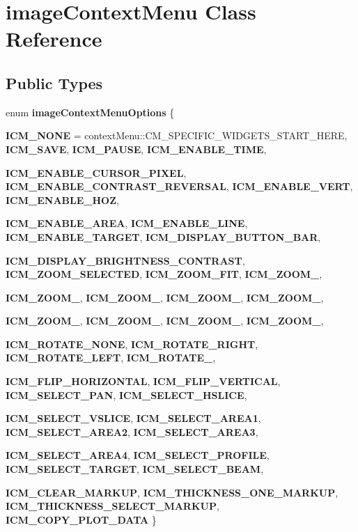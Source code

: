 \hypertarget{classimageContextMenu}{
\section{imageContextMenu Class Reference}
\label{classimageContextMenu}
}
\subsection*{Public Types}
\begin{DoxyCompactItemize}
\item 
enum {\bfseries imageContextMenuOptions} \{ \par
{\bfseries ICM\_\-NONE} =  contextMenu::CM\_\-SPECIFIC\_\-WIDGETS\_\-START\_\-HERE, 
{\bfseries ICM\_\-SAVE}, 
{\bfseries ICM\_\-PAUSE}, 
{\bfseries ICM\_\-ENABLE\_\-TIME}, 
\par
{\bfseries ICM\_\-ENABLE\_\-CURSOR\_\-PIXEL}, 
{\bfseries ICM\_\-ENABLE\_\-CONTRAST\_\-REVERSAL}, 
{\bfseries ICM\_\-ENABLE\_\-VERT}, 
{\bfseries ICM\_\-ENABLE\_\-HOZ}, 
\par
{\bfseries ICM\_\-ENABLE\_\-AREA}, 
{\bfseries ICM\_\-ENABLE\_\-LINE}, 
{\bfseries ICM\_\-ENABLE\_\-TARGET}, 
{\bfseries ICM\_\-DISPLAY\_\-BUTTON\_\-BAR}, 
\par
{\bfseries ICM\_\-DISPLAY\_\-BRIGHTNESS\_\-CONTRAST}, 
{\bfseries ICM\_\-ZOOM\_\-SELECTED}, 
{\bfseries ICM\_\-ZOOM\_\-FIT}, 
{\bfseries ICM\_\-ZOOM\_}, 
\par
{\bfseries ICM\_\-ZOOM\_}, 
{\bfseries ICM\_\-ZOOM\_}, 
{\bfseries ICM\_\-ZOOM\_}, 
{\bfseries ICM\_\-ZOOM\_}, 
\par
{\bfseries ICM\_\-ZOOM\_}, 
{\bfseries ICM\_\-ZOOM\_}, 
{\bfseries ICM\_\-ZOOM\_}, 
{\bfseries ICM\_\-ZOOM\_}, 
\par
{\bfseries ICM\_\-ROTATE\_\-NONE}, 
{\bfseries ICM\_\-ROTATE\_\-RIGHT}, 
{\bfseries ICM\_\-ROTATE\_\-LEFT}, 
{\bfseries ICM\_\-ROTATE\_}, 
\par
{\bfseries ICM\_\-FLIP\_\-HORIZONTAL}, 
{\bfseries ICM\_\-FLIP\_\-VERTICAL}, 
{\bfseries ICM\_\-SELECT\_\-PAN}, 
{\bfseries ICM\_\-SELECT\_\-HSLICE}, 
\par
{\bfseries ICM\_\-SELECT\_\-VSLICE}, 
{\bfseries ICM\_\-SELECT\_\-AREA1}, 
{\bfseries ICM\_\-SELECT\_\-AREA2}, 
{\bfseries ICM\_\-SELECT\_\-AREA3}, 
\par
{\bfseries ICM\_\-SELECT\_\-AREA4}, 
{\bfseries ICM\_\-SELECT\_\-PROFILE}, 
{\bfseries ICM\_\-SELECT\_\-TARGET}, 
{\bfseries ICM\_\-SELECT\_\-BEAM}, 
\par
{\bfseries ICM\_\-CLEAR\_\-MARKUP}, 
{\bfseries ICM\_\-THICKNESS\_\-ONE\_\-MARKUP}, 
{\bfseries ICM\_\-THICKNESS\_\-SELECT\_\-MARKUP}, 
{\bfseries ICM\_\-COPY\_\-PLOT\_\-DATA}
 \}
\end{DoxyCompactItemize}
